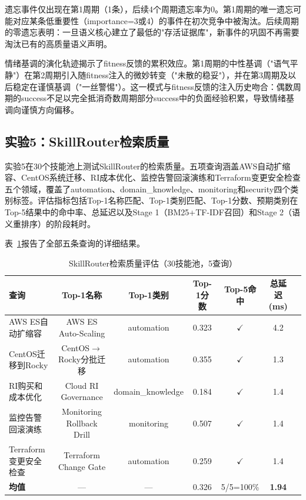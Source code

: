 \documentclass[12pt,a4paper]{ctexart}
\begin{document}
遗忘事件仅出现在第1周期（1条），后续4个周期遗忘率为0。第1周期的唯一遗忘可能对应某条低重要性（importance=3或4）的事件在初次竞争中被淘汰。后续周期的零遗忘表明：一旦语义核心建立了最低的"存活证据库"，新事件的巩固不再需要淘汰已有的高质量语义声明。

情绪基调的演化轨迹揭示了fitness反馈的累积效应。第1周期的中性基调（"语气平静"）在第2周期引入随fitness注入的微妙转变（"未散的稳妥"），并在第3周期及以后稳定在谨慎基调（"一丝警惕"）。这一模式与fitness反馈的注入历史吻合：偶数周期的success不足以完全抵消奇数周期部分success中的负面经验积累，导致情绪基调向谨慎方向偏移。

\subsection{实验5：SkillRouter检索质量}

实验5在30个技能池上测试SkillRouter的检索质量。五项查询涵盖AWS自动扩缩容、CentOS系统迁移、RI成本优化、监控告警回滚演练和Terraform变更安全检查五个领域，覆盖了automation、domain\_knowledge、monitoring和security四个类别标签。评估指标包括Top-1名称匹配、Top-1类别匹配、Top-1分数、预期类别在Top-5结果中的命中率、总延迟以及Stage 1（BM25+TF-IDF召回）和Stage 2（语义重排序）的阶段耗时。

表~\ref{tab:router}报告了全部五条查询的详细结果。

\begin{table}[H]
\centering
\caption{SkillRouter检索质量评估（30技能池，5查询）}
\label{tab:router}
\renewcommand{\arraystretch}{1.15}
\begin{tabular}{lcccccc}
\toprule
查询 & Top-1名称 & Top-1类别 & Top-1分数 & Top-5命中 & 总延迟(ms) \\
\midrule
AWS ES自动扩缩容 & AWS ES Auto-Scaling & automation & 0.323 & $\checkmark$ & 4.2 \\
CentOS迁移到Rocky & CentOS$\to$Rocky分批迁移 & automation & 0.355 & $\checkmark$ & 1.3 \\
RI购买和成本优化 & Cloud RI Governance & domain\_knowledge & 0.184 & $\checkmark$ & 1.4 \\
监控告警回滚演练 & Monitoring Rollback Drill & monitoring & 0.507 & $\checkmark$ & 1.4 \\
Terraform变更安全检查 & Terraform Change Gate & automation & 0.259 & $\checkmark$ & 1.4 \\
\midrule
\textbf{均值} & — & — & 0.326 & 5/5=100\% & \textbf{1.94} \\
\bottomrule
\end{tabular}
\end{table}
\end{document}
